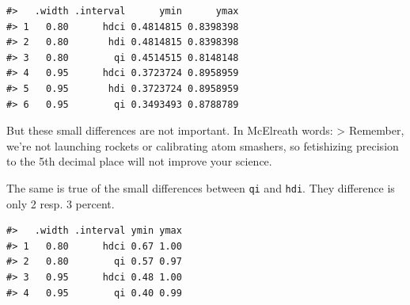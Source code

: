 \documentclass[
  letterpaper,
  DIV=11,
  numbers=noendperiod]{scrreprt}
\newenvironment{Shaded}{\begin{snugshade}}{\end{snugshade}}
\newcommand{\AttributeTok}[1]{\textcolor[rgb]{0.40,0.45,0.13}{#1}}
\newcommand{\CommentTok}[1]{\textcolor[rgb]{0.37,0.37,0.37}{#1}}
\newcommand{\DecValTok}[1]{\textcolor[rgb]{0.68,0.00,0.00}{#1}}
\newcommand{\FunctionTok}[1]{\textcolor[rgb]{0.28,0.35,0.67}{#1}}
\newcommand{\InformationTok}[1]{\textcolor[rgb]{0.37,0.37,0.37}{#1}}
\newcommand{\NormalTok}[1]{\textcolor[rgb]{0.00,0.23,0.31}{#1}}
\newcommand{\SpecialCharTok}[1]{\textcolor[rgb]{0.37,0.37,0.37}{#1}}
\begin{document}
\begin{verbatim}
#>   .width .interval      ymin      ymax
#> 1   0.80      hdci 0.4814815 0.8398398
#> 2   0.80       hdi 0.4814815 0.8398398
#> 3   0.80        qi 0.4514515 0.8148148
#> 4   0.95      hdci 0.3723724 0.8958959
#> 5   0.95       hdi 0.3723724 0.8958959
#> 6   0.95        qi 0.3493493 0.8788789
\end{verbatim}

But these small differences are not important. In McElreath words:
\textgreater{} Remember, we're not launching rockets or calibrating atom
smashers, so fetishizing precision to the 5th decimal place will not
improve your science.

The same is true of the small differences between \texttt{qi} and
\texttt{hdi}. They difference is only 2 resp. 3 percent.

\begin{Shaded}
\end{Shaded}

\begin{verbatim}
#>   .width .interval ymin ymax
#> 1   0.80      hdci 0.67 1.00
#> 2   0.80        qi 0.57 0.97
#> 3   0.95      hdci 0.48 1.00
#> 4   0.95        qi 0.40 0.99
\end{verbatim}
\end{document}
